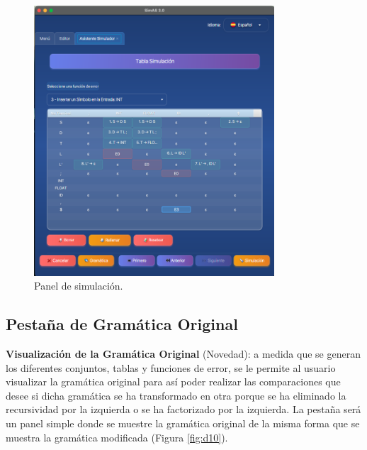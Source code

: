 \begin{figure}[htp]
\centering
	\includegraphics[width=0.8\textwidth]{figuras2/simulador/paso5_tablaPredictivaCompleta.png}
	\caption{Panel de simulación.}
	\label{fig:d6}
\end{figure}

\subsection{Pestaña de Gramática Original}

\textbf{Visualización de la Gramática Original} (Novedad): a medida que se generan los diferentes conjuntos, tablas y funciones de error, se le permite al usuario visualizar la gramática original para así poder realizar las comparaciones que desee si dicha gramática se ha transformado en otra porque se ha eliminado la recursividad por la izquierda o se ha factorizado por la izquierda. La pestaña será un panel simple donde se muestre la gramática original de la misma forma que se muestra la gramática modificada (Figura \ref{fig:d10}).

